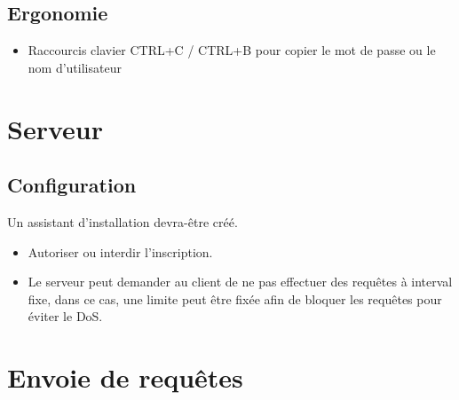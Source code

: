 \documentclass[oneside]{report}
\begin{document}
	\section{Ergonomie}{
		\begin{itemize}
			\item Raccourcis clavier CTRL+C / CTRL+B pour copier le mot de passe ou le nom d'utilisateur
		\end{itemize}
	}

	\chapter{Serveur}
	\section{Configuration}{
		\par Un assistant d'installation devra-être créé.
		\begin{itemize}
			\item Autoriser ou interdir l'inscription.
			\item Le serveur peut demander au client de ne pas effectuer des requêtes à interval fixe, dans ce cas, une limite peut être fixée afin de bloquer les requêtes pour éviter le DoS.
		\end{itemize}
	}

	\chapter{Envoie de requêtes}
\end{document}
